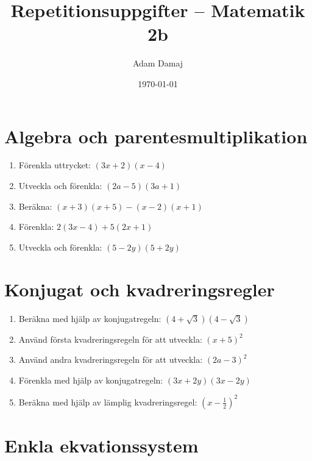 \documentclass[a4paper,11pt]{article}
\title{Repetitionsuppgifter -- Matematik 2b}
\author{Adam Damaj}
\date{\today}
\begin{document}
\maketitle

\section{Algebra och parentesmultiplikation}

\begin{enumerate}[label=\textbf{\arabic*.}]
    \item Förenkla uttrycket: $(3x + 2)(x - 4)$
    
    \item Utveckla och förenkla: $(2a - 5)(3a + 1)$
    
    \item Beräkna: $(x + 3)(x + 5) - (x - 2)(x + 1)$
    
    \item Förenkla: $2(3x - 4) + 5(2x + 1)$
    
    \item Utveckla och förenkla: $(5 - 2y)(5 + 2y)$
\end{enumerate}

\section{Konjugat och kvadreringsregler}

\begin{enumerate}[label=\textbf{\arabic*.}]
    \item Beräkna med hjälp av konjugatregeln: $(4 + \sqrt{3})(4 - \sqrt{3})$
    
    \item Använd första kvadreringsregeln för att utveckla: $(x + 5)^2$
    
    \item Använd andra kvadreringsregeln för att utveckla: $(2a - 3)^2$
    
    \item Förenkla med hjälp av konjugatregeln: $(3x + 2y)(3x - 2y)$
    
    \item Beräkna med hjälp av lämplig kvadreringsregel: $(x - \frac{1}{2})^2$
\end{enumerate}

\section{Enkla ekvationssystem}
\end{document}
